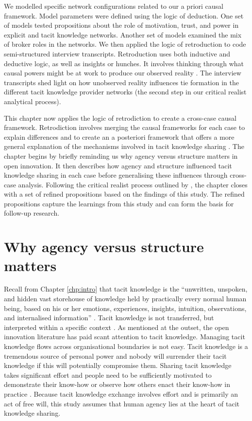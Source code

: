We modelled specific network configurations related to our a priori causal framework. Model parameters were defined using the logic of deduction. One set of models tested propositions about the role of motivation, trust, and power in explicit and tacit knowledge networks. Another set of models examined the mix of broker roles in the networks. We then applied the logic of retroduction to code semi-structured interview transcripts. Retroduction uses both inductive and deductive logic, as well as insights or hunches. It involves thinking through what causal powers might be at work to produce our observed reality \citep{jagosh2020retroductive}. The interview transcripts shed light on how unobserved reality influences tie formation in the different tacit knowledge provider networks (the second step in our critical realist analytical process). \medskip

This chapter now applies the logic of retrodiction to create a cross-case causal framework. Retrodiction involves merging the causal frameworks for each case to explain differences and to create an a posteriori framework that offers a more general explanation of the mechanisms involved in tacit knowledge sharing \citep{welch2011theorising,mcavoy2018critical}. The chapter begins by briefly reminding us why agency versus structure matters in open innovation. It then describes how agency and structure influenced tacit knowledge sharing in each case before generalising these influences through cross-case analysis. Following the critical realist process outlined by \citet{mcavoy2018critical}, the chapter closes with a set of refined propositions based on the findings of this study. The refined propositions capture the learnings from this study and can form the basis for follow-up research.

\section{Why agency versus structure matters}

Recall from Chapter \ref{chp:intro} that tacit knowledge is the \enquote{unwritten, unspoken, and hidden vast storehouse of knowledge held by practically every normal human being, based on his or her emotions, experiences, insights, intuition, observations, and internalised information} \citep{kreutz2014catalyzing}. Tacit knowledge is not transferred, but interpreted within a specific context \citep{nonaka1994dynamic,duguid2005art,marabelli2014knowing,zhang2020extended}. As mentioned at the outset, the open innovation literature has paid scant attention to tacit knowledge. Managing tacit knowledge flows across organisational boundaries is not easy. Tacit knowledge is a tremendous source of personal power and nobody will surrender their tacit knowledge if this will potentially compromise them. Sharing tacit knowledge takes significant effort and people need to be sufficiently motivated to demonstrate their know-how or observe how others enact their know-how in practice \citep{gagne2009model}. Because tacit knowledge exchange involves effort and is primarily an act of free will, this study assumes that human agency lies at the heart of tacit knowledge sharing. \medskip

